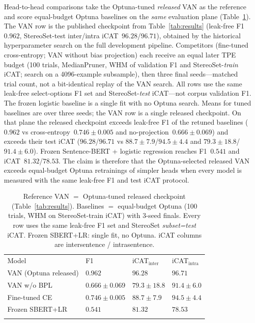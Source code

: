 \documentclass{IEEEcsmag}
\begin{document}
Head-to-head comparisons take the Optuna-tuned \emph{released} VAN as the reference and score equal-budget Optuna baselines on the \emph{same} evaluation plane (Table~\ref{tab:baselines}). The VAN row is the published checkpoint from Table~\ref{tab:results} (leak-free F1~$0.962$, StereoSet-test inter/intra iCAT~$96.28$/$96.71$), obtained by the historical hyperparameter search on the full development pipeline. Competitors (fine-tuned cross-entropy; VAN without bias projection) each receive an equal later TPE budget (100 trials, MedianPruner, WHM of validation F1 and StereoSet-\emph{train} iCAT; search on a 4096-example subsample), then three final seeds---matched trial count, not a bit-identical replay of the VAN search. All rows use the same leak-free select-options F1 set and StereoSet-\emph{test} iCAT---not corpus validation F1. The frozen logistic baseline is a single fit with no Optuna search. Means for tuned baselines are over three seeds; the VAN row is a single released checkpoint. On that plane the released checkpoint exceeds leak-free F1 of the retuned baselines ($0.962$ vs cross-entropy~$0.746\pm0.005$ and no-projection~$0.666\pm0.069$) and exceeds their test iCAT ($96.28$/$96.71$ vs $88.7\pm7.9$/$94.5\pm4.4$ and $79.3\pm18.8$/$91.4\pm6.0$). Frozen Sentence-BERT + logistic regression reaches F1~$0.541$ and iCAT~$81.32$/$78.53$. The claim is therefore that the Optuna-selected released VAN exceeds equal-budget Optuna retrainings of simpler heads when every model is measured with the same leak-free F1 and test iCAT protocol.

\begin{table}
\caption{Reference VAN $=$ Optuna-tuned released checkpoint (Table~\ref{tab:results}). Baselines $=$ equal-budget Optuna (100 trials, WHM on StereoSet-train iCAT) with 3-seed finals. Every row uses the same leak-free F1 set and StereoSet \emph{subset=test} iCAT. Frozen SBERT+LR: single fit, no Optuna. iCAT columns are intersentence / intrasentence.}
\label{tab:baselines}
\tablefont
\begin{tabular*}{17.5pc}{@{}p{72pt}<{\raggedright}p{36pt}<{\raggedright}p{36pt}<{\raggedright}p{36pt}@{}}
\toprule
Model & F1 & iCAT$_\mathrm{inter}$ & iCAT$_\mathrm{intra}$\\
\colrule
VAN (Optuna released) & $0.962$ & $96.28$ & $96.71$\\
VAN w/o BPL & $0.666\pm0.069$ & $79.3\pm18.8$ & $91.4\pm6.0$\\
Fine-tuned CE & $0.746\pm0.005$ & $88.7\pm7.9$ & $94.5\pm4.4$\\
Frozen SBERT+LR & $0.541$ & $81.32$ & $78.53$\\
\botrule
\end{tabular*}
\end{table}
\end{document}
